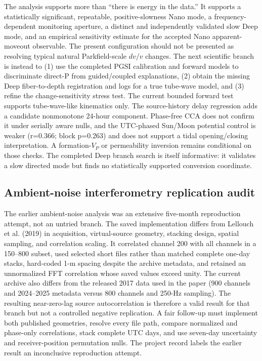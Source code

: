 \documentclass[11pt]{article}
\begin{document}
The analysis supports more than ``there is energy in the data.''  It supports a
statistically significant, repeatable, positive-slowness Nano mode, a
frequency-dependent monitoring aperture, a distinct and independently validated
slow Deep mode, and an empirical sensitivity estimate for the accepted Nano
apparent-moveout observable.  The present configuration should not be presented
as resolving typical natural Parkfield-scale $dv/v$ changes.  The next scientific
branch is instead to (1) use the completed PGSI calibration and forward models
to discriminate direct-P from guided/coupled explanations, (2) obtain the missing Deep fiber-to-depth registration and logs for a
true tube-wave model, and (3) refine the change-sensitivity stress test.  The
current bounded forward test supports tube-wave-like kinematics only.  The source-history delay regression adds a candidate nonmonotone 24-hour component. Phase-free CCA does not confirm it under serially aware nulls, and the UTC-phased Sun/Moon potential control is weaker (r=0.366; block p=0.263) and does not support a tidal opening/closing interpretation.  A formation-$V_P$ or
permeability inversion remains conditional on those checks.  The completed
Deep branch search is itself informative: it validates a slow directed mode
but finds no statistically supported conversion coordinate.


\subsection{Ambient-noise interferometry replication audit}
The earlier ambient-noise analysis was an extensive five-month reproduction attempt, not an untried branch. The saved implementation differs from Lellouch et al. (2019) in acquisition, virtual-source geometry, stacking design, spatial sampling, and correlation scaling. It correlated channel 200 with all channels in a 150--800 subset, used selected short files rather than matched complete one-day stacks, hard-coded 1-m spacing despite the archive metadata, and retained an unnormalized FFT correlation whose saved values exceed unity. The current archive also differs from the released 2017 data used in the paper (900 channels and 2024--2025 metadata versus 800 channels and 250-Hz sampling). The resulting near-zero-lag source autocorrelation is therefore a valid result for that branch but not a controlled negative replication. A fair follow-up must implement both published geometries, resolve every file path, compare normalized and phase-only correlations, stack complete UTC days, and use seven-day uncertainty and receiver-position permutation nulls. The project record labels the earlier result an inconclusive reproduction attempt.
\end{document}
